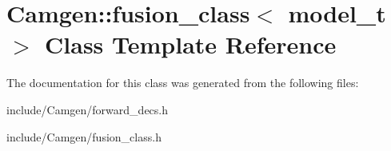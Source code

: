 \hypertarget{a00238}{}\section{Camgen\+:\+:fusion\+\_\+class$<$ model\+\_\+t $>$ Class Template Reference}
\label{a00238}


The documentation for this class was generated from the following files\+:\begin{DoxyCompactItemize}
\item 
include/\+Camgen/forward\+\_\+decs.\+h\item 
include/\+Camgen/fusion\+\_\+class.\+h\end{DoxyCompactItemize}
